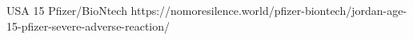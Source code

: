           {
            USA
          }
          {
            15
          }
          {
            Pfizer/BioNtech
          }
          {
          }
          {
          }
          {
            https://nomoresilence.world/pfizer-biontech/jordan-age-15-pfizer-severe-adverse-reaction/
          }


